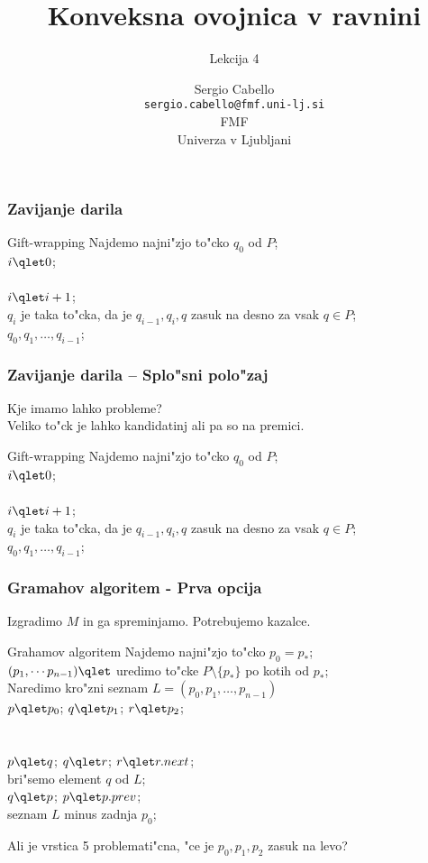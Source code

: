 \documentclass{beamer}
\title[RC -- Konveksnost - 2d]{Konveksna ovojnica v ravnini}
\subtitle{Lekcija 4}
\author[Sergio Cabello]{Sergio Cabello \\ \texttt{sergio.cabello@fmf.uni-lj.si}\\ FMF \\ Univerza v Ljubljani}
\date{}
\begin{document}
\begin{frame}
    \titlepage
\end{frame}


\begin{frame}
	\frametitle{Zavijanje darila}
	
	\begin{algorithm}{Gift-wrapping}{}
		Najdemo najni"zjo to"cko $q_0$ od $P$;\\
		$i \qlet 0$;\\
		\qrepeat\\
				$i\qlet i+1$;\\
				$q_{i}$ je taka to"cka, da je $q_{i-1},q_{i}, q$ zasuk na desno za vsak $q\in P$;
		\\
		\qreturn $q_0,q_1,\dots, q_{i-1}$;
	\end{algorithm}
\end{frame}

\begin{frame}
	\frametitle{Zavijanje darila -- Splo"sni polo"zaj}
	Kje imamo lahko probleme? \\ 
	Veliko to"ck je lahko kandidatinj ali pa so na premici.\\
	\bigskip
	\begin{algorithm}{Gift-wrapping}{}
		Najdemo \alert{najni"zjo to"cko} $q_0$ od $P$;\\
		$i \qlet 0$;\\
		\qrepeat\\
				$i\qlet i+1$;\\
				$q_{i}$ je taka to"cka, da je \alert{$q_{i-1},q_{i}, q$} zasuk na desno za vsak $q\in P$;
		\\
		\qreturn $q_0,q_1,\dots, q_{i-1}$;
	\end{algorithm}
\end{frame}


\begin{frame}
	\frametitle{Gramahov algoritem - Prva opcija}
	Izgradimo $M$ in ga spreminjamo. Potrebujemo kazalce.
	\medskip
	\begin{algorithm}{Grahamov algoritem}{}
		Najdemo najni"zjo to"cko $p_0=p_*$;\\
		$(p_1,\dotsm p_{n-1})\qlet$ uredimo to"cke $P\setminus \{p_*\}$  po kotih od $p_*$;\\
		Naredimo kro"zni seznam $L=(p_0,p_1,\dots, p_{n-1})$\\
		$p\qlet p_0$; $q\qlet p_1$; $r\qlet p_2$;\\
		\\
			\\
				$p\qlet q$; $q\qlet r$; $r\qlet r.next$;\\
			\qelse bri"semo element $q$ od $L$;\\
				$q\qlet p$; $p\qlet p.prev$;
			\qfi
		\qelihw\\
		\qreturn seznam $L$ minus zadnja $p_0$;
	\end{algorithm}
	\smallskip
	Ali je vrstica 5 problemati"cna, "ce je $p_0,p_1,p_2$ zasuk na levo? 
\end{frame}
\end{document}
